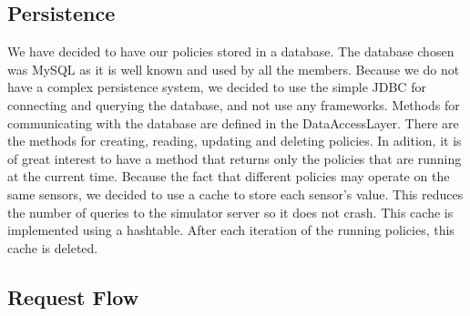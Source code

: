 \subsection{Persistence}
We have decided to have our policies stored in a database. The database chosen was MySQL as it is well known and used by all the members. Because we do not have a complex persistence system, we decided to use the simple JDBC for connecting and querying the database, and not use any frameworks. 
Methods for communicating with the database are defined in the DataAccessLayer. There are the methods for creating, reading, updating and deleting policies. In adition, it is of great interest to have a method that returns only the policies that are running at the current time. 
Because the fact that different policies may operate on the same sensors, we decided to use a cache to store each sensor's value. This reduces the number of queries to the simulator server so it does not crash. This cache is implemented using a hashtable. After each iteration of the running policies, this cache is deleted. 
\subsection{Request Flow}